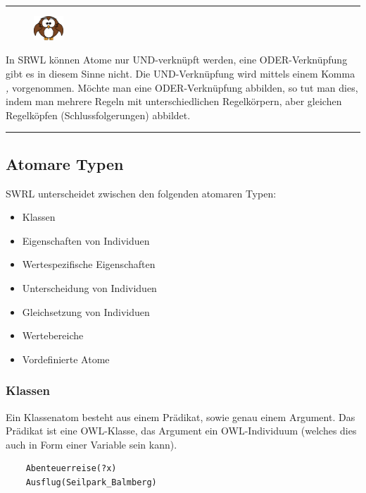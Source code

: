 \noindent\rule[1ex]{\textwidth}{1pt}
\begin{figure}
    \vspace{-12pt}
    \includegraphics[width=0.1\textwidth]{bilder/owl.png}
\end{figure}
In SRWL können Atome nur UND-verknüpft werden, eine ODER-Verknüpfung gibt es in diesem Sinne nicht. Die UND-Verknüpfung wird mittels einem Komma \textit{,} vorgenommen. Möchte man eine ODER-Verknüpfung abbilden, so tut man dies, indem man mehrere Regeln mit unterschiedlichen Regelkörpern, aber gleichen Regelköpfen (Schlussfolgerungen) abbildet.\\

\noindent\rule[1ex]{\textwidth}{1pt}

\subsection{Atomare Typen}
\label{subsec:swrl_aufbau_atomaretypen}
SWRL unterscheidet zwischen den folgenden atomaren Typen:
\begin{itemize}
    \item Klassen
    \item Eigenschaften von Individuen
    \item Wertespezifische Eigenschaften
    \item Unterscheidung von Individuen
    \item Gleichsetzung von Individuen
    \item Wertebereiche
    \item Vordefinierte Atome
\end{itemize}

\subsubsection{Klassen}
\label{ssubsec:swrl_aufbau_atomaretypen_klassen}
Ein Klassenatom besteht aus einem Prädikat, sowie genau einem Argument. Das Prädikat ist eine OWL-Klasse, das Argument ein OWL-Individuum (welches dies auch in Form einer Variable sein kann).
\lstset{language=XML}
\begin{lstlisting}
    Abenteuerreise(?x)
    Ausflug(Seilpark_Balmberg)
\end{lstlisting}

